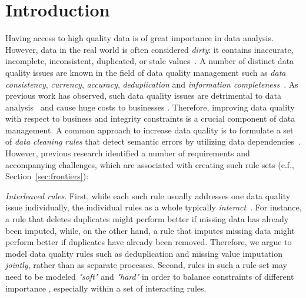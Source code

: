 \section{Introduction}
\label{sec:intro}

Having access to high quality data is of great importance in data analysis. However, data in the real world is often considered \textit{dirty}: it contains inaccurate, incomplete, inconsistent, duplicated, or stale values~\cite{chu2004blissful}. A number of distinct data quality issues are known in the field of data quality management such as \textit{data consistency}, \textit{currency}, \textit{accuracy}, \textit{deduplication} and \textit{information completeness}~\cite{fan2012foundations}. As previous work has observed, such data quality issues are detrimental to data analysis~\cite{national2013Frontiers,Fan:2008:CFD:1366102.1366103} and cause huge costs to busi\-nesses \cite{waynew.eckerson2002}. Therefore, improving data quality with respect to business and integrity constraints is a crucial component of data management. 
A common approach to increase data quality is to formulate a set of \textit{data cleaning rules} that detect semantic errors by utilizing data dependencies~\cite{fan2012foundations, Arasu:2009:LDC:1546683.1547340, Dallachiesa:2013:NCD:2463676.2465327, llunaticVDLB2013b}. However, previous research identified a number of requirements and accompanying challenges, which are associated with creating such rule sets (c.f., Section~\ref{sec:frontiers}): 

\textit{Interleaved rules}. First, while each such rule usually addresses one data quality issue individually, the individual rules as a whole typically \textit{interact}~\cite{fan2012foundations, Fan:2014:IRM:2628135.2567657}. For instance, a rule that deletes duplicates might perform better if missing data has already been imputed, while, on the other hand, a rule that imputes missing data might perform better if duplicates have already been removed. Therefore, we argue to model data quality rules such as deduplication and missing value imputation \textit{jointly}, rather than as separate processes.
Second, rules in such a rule-set may need to be modeled \textit{"soft"} and \textit{"hard"} in order to balance constraints of different importance \cite{Yakout:2013:DSU:2463676.2463706}, especially within a set of interacting rules. 

